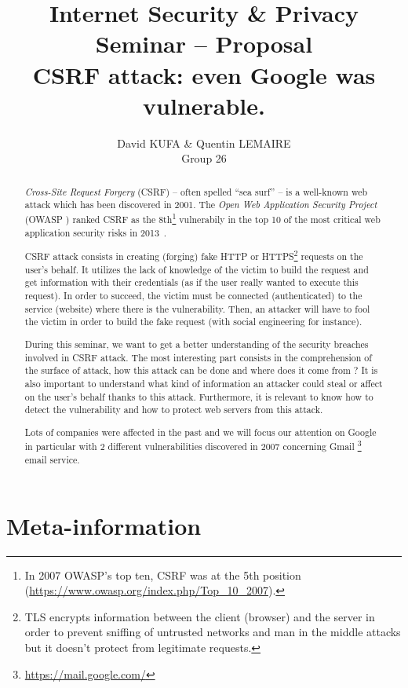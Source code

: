 \documentclass[a4paper,11pt]{article}
\title{Internet Security \& Privacy\\Seminar -- Proposal\\\vspace{10pt}\textbf{CSRF attack: even Google was vulnerable.}}
\author{David KUFA \& Quentin LEMAIRE\\Group 26}
\newcommand{\csrf}{\textit{Cross-Site Request Forgery}}
\begin{document}
  \maketitle %

  \begin{abstract}
  \csrf{} (CSRF) -- often spelled ``sea surf'' -- is a well-known web attack which has 
  been discovered in 2001. The \textit{Open Web Application Security Project} (OWASP \cite{owasp}) 
  ranked CSRF as the 8th\footnote{In 2007 OWASP's top ten, CSRF was at the 5th position 
  (\url{https://www.owasp.org/index.php/Top_10_2007}).} vulnerabily in the top 10 of the 
  most critical web application security risks in 2013~\cite{owasp_top_ten}.
  
  CSRF attack consists in creating (forging) fake HTTP or HTTPS\footnote{TLS encrypts 
  information between the client (browser) and the server in order to prevent sniffing 
  of untrusted networks and man in the middle attacks but it doesn't protect from 
  legitimate requests.} requests on the user's behalf. It utilizes the lack of knowledge 
  of the victim to build the request and get information with their credentials (as if 
  the user really wanted to execute this request). In order to succeed, the victim must 
  be connected (authenticated) to the service (website) where there is the vulnerability. 
  Then, an attacker will have to fool the victim in order to build the fake request (with 
  social engineering for instance).
  
  During this seminar, we want to get a better understanding of the security breaches 
  involved in CSRF attack. The most interesting part consists in the comprehension of 
  the surface of attack, how this attack can be done and where does it come from ? It 
  is also important to understand what kind of information an attacker could steal or 
  affect on the user's behalf thanks to this attack. Furthermore, it is relevant to 
  know how to detect the vulnerability and how to protect web servers from this attack.
  
  Lots of companies were affected in the past and we will focus our attention on Google 
  in particular with 2 different vulnerabilities discovered in 2007 concerning Gmail
  \footnote{\url{https://mail.google.com/}} email service.
  \end{abstract}


  \section{Meta-information}
  
\end{document}
